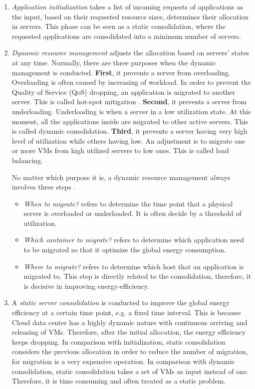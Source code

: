 \begin{enumerate}
	\item \emph{Application initialization} takes a list of incoming requests of applications as the input, based on their requested resource sizes, determines their allocation in servers. This phase can be seen as a static consolidation, where the requested applications are consolidated into a minimum number of servers.
	\item \emph{Dynamic resource management} adjusts the allocation based on servers' states at any time. Normally, there are three purposes when the dynamic management is conducted. \textbf{First},  it prevents a server from overloading. Overloading is often caused by increasing of workload. In order to prevent the Quality of Service (QoS) dropping, an application is migrated to another server. This is called hot-spot mitigation \cite{Mishra:2012kx}. \textbf{Second}, it prevents a server from underloading. Underloading is when a server in a low utilization state. At this moment, all the applications inside are migrated to other active servers. This is called dynamic consolidation. \textbf{Third}, it prevents a server having very high level of utilization while others having low. An adjustment is to migrate one or more VMs from high utilized servers to low ones. This is called load balancing.

	No matter which purpose it is, a dynamic resource management always involves three steps . 
	\begin{itemize}
		\item \emph{When to migrate?} refers to determine the time point that a physical server is overloaded or underloaded. It is often decide by a threshold of utilization.
		\item \emph{Which container to migrate?} refers to determine which application need to be migrated so that it optimize the global energy consumption.
		\item \emph{Where to migrate?} refers to determine which host that an application is migrated to. This step is directly related to the consolidation, therefore, it is decisive in improving energy-efficiency.
	\end{itemize}

	\item A \emph{static server consolidation} is conducted to improve the global energy efficiency at a certain time point, e.g. a fixed time interval. This is because Cloud data center has a highly dynamic nature with continuous arriving and releasing of VMs. Therefore, after the initial allocation, the energy efficiency keeps dropping. In comparison with initialization, static consolidation considers the previous allocation in order to reduce the number of migration, for migration is a very expensive operation. In comparison with dynamic consolidation, static consolidation takes a set of VMs as input instead of one. Therefore, it is time consuming and often treated as a static problem.
\end{enumerate}

